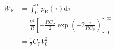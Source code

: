 \documentclass{article}[11pt]
\begin{document}
\begin{equation}
\begin{split}
W_{\mathrm{R}} & = \int_0^{\infty} p_{\mathrm{R}}(\tau) \mathrm{d} \tau                                                                             \\
               & = \frac{V_{\mathrm{0}}^2}{R} \left[-\frac{R C_{\mathrm{P}}}{2} \exp\left(-2\frac{\tau}{R C_{\mathrm{P}}}\right) \right]_0^{\infty} \\
               & = \frac{1}{2} C_{\mathrm{P}} V_{\mathrm{0}}^2
\end{split}
\end{equation}


\printbibliography
\end{document}
